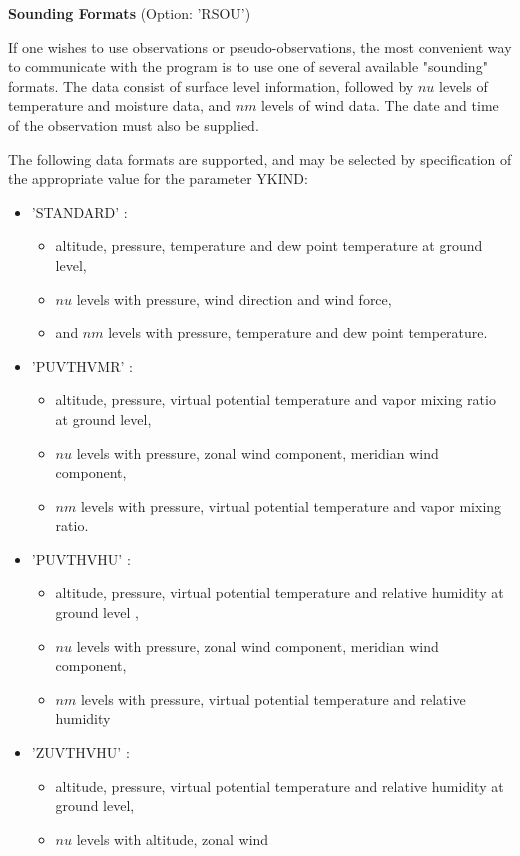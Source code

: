 {\bf Sounding Formats } (Option: 'RSOU')

If one wishes to use observations or pseudo-observations, the most convenient
way to communicate with the program is to use one of several available
"sounding" formats. The data consist of surface level information, followed
by $nu$ levels of temperature and moisture data, and $nm$ levels of wind data.
The date and time of the observation must also be supplied.

The following  data formats are supported, and may be selected by specification
of the appropriate value for the parameter YKIND:
\begin{itemize}
\item 'STANDARD'  :
\begin{itemize} \item altitude, pressure, temperature and dew point temperature at
ground level,
\item $nu$ levels with pressure, wind direction and wind force,
\item and $nm$
levels with pressure, temperature and dew point temperature.
\end{itemize}
\item 'PUVTHVMR'  : \begin{itemize} \item altitude, pressure, virtual potential temperature
and vapor mixing ratio at ground level,\item   $nu$ levels with pressure, zonal wind
component, meridian wind component,\item  $nm$ levels with pressure, virtual potential temperature
and vapor mixing ratio.\end{itemize}
\item 'PUVTHVHU' : \begin{itemize} \item altitude, pressure, virtual potential temperature
and relative humidity at ground level , \item $nu$ levels with pressure, zonal wind
component, meridian wind component,\item  $nm$ levels with pressure, virtual potential temperature
and relative humidity \end{itemize}
\item 'ZUVTHVHU'  : \begin{itemize} \item altitude, pressure, virtual potential temperature
and relative humidity at ground level,\item    $nu$ levels with altitude, zonal wind

\end{itemize}
\end{itemize}
